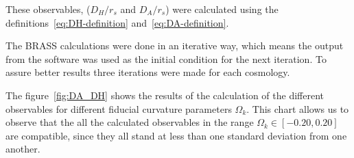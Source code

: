 These observables, ($D_H /r_s$ and $D_A /r_s $) were calculated using the definitions~\eqref{eq:DH-definition} and~\eqref{eq:DA-definition}.

The BRASS calculations were done in an iterative way, which means the output from the software was used as the initial condition for the next iteration. To assure better results three iterations were made for each cosmology. 

The figure~\ref{fig:DA_DH} shows the results of the calculation of the different observables for different fiducial curvature parameters $\Omega_k$. This chart allows us to observe that the all the calculated observables in the range $\Omega_k  \in \left[ -0.20, 0.20   \right] $ are compatible, since they all stand at less than one standard deviation from one another.

